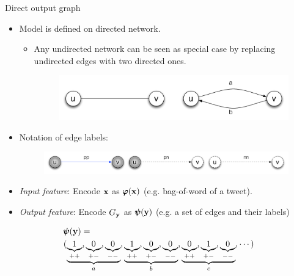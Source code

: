 \documentclass[first=dgreen,second=purple,logo=yellowexc]{aaltoslides}
\begin{document}
\begin{frame}{Direct output graph}
	\begin{itemize}\footnotesize
		\item Model is defined on directed network.
		\begin{itemize}\footnotesize
			\item Any undirected network can be seen as special case by replacing undirected edges with two directed ones.
			\begin{figure}
				\center
				\includegraphics[scale=0.2]{./figures/model_definition.pdf}
			\end{figure}
		\end{itemize}
		\item Notation of edge labels:
		\begin{figure}
			\center
			\includegraphics[scale=0.2]{./figures/notations.pdf}
		\end{figure}
		\item {\it Input feature}: Encode $\mathbf {x}$ as $\pmb \varphi(\mathbf {x})$ (e.g. bag-of-word of a tweet).
		\item {\it Output feature}: Encode $G_{\mathbf {y}}$ as $\pmb \psi(\mathbf {y})$ (e.g. a set of edges and their labels)
	\end{itemize}
	\begin{multicols}{2}
	{\scriptsize
		\begin{align*}
			&\pmb \psi(\mathbf {y}) = \\
			& ( \underbrace{\underbrace{1}_{++}, \underbrace{0}_{+-}, \underbrace{0}_{--}}_{a}, 
			\underbrace{\underbrace{1}_{++}, \underbrace{0}_{+-}, \underbrace{0}_{--}}_{b},
			\underbrace{\underbrace{0}_{++}, \underbrace{1}_{+-}, \underbrace{0}_{--}}_{c},\cdots)
		\end{align*}}
	\begin{figure}

\end{figure}
\end{multicols}
\end{frame}
\end{document}
